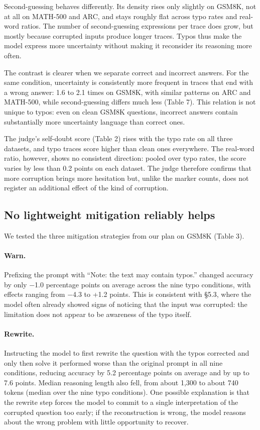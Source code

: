 \documentclass[11pt]{article}
\begin{document}
Second-guessing behaves differently. Its density rises only slightly on GSM8K, not at all on MATH-500 and ARC, and stays roughly flat across typo rates and real-word ratios. The number of second-guessing expressions per trace does grow, but mostly because corrupted inputs produce longer traces. Typos thus make the model express more uncertainty without making it reconsider its reasoning more often.

The contrast is clearer when we separate correct and incorrect answers. For the same condition, uncertainty is consistently more frequent in traces that end with a wrong answer: 1.6 to 2.1 times on GSM8K, with similar patterns on ARC and MATH-500, while second-guessing differs much less (Table 7). This relation is not unique to typos: even on clean GSM8K questions, incorrect answers contain substantially more uncertainty language than correct ones.

The judge's self-doubt score (Table 2) rises with the typo rate on all three datasets, and typo traces score higher than clean ones everywhere. The real-word ratio, however, shows no consistent direction: pooled over typo rates, the score varies by less than 0.2 points on each dataset. The judge therefore confirms that more corruption brings more hesitation but, unlike the marker counts, does not register an additional effect of the kind of corruption.

\subsection{No lightweight mitigation reliably helps}
We tested the three mitigation strategies from our plan on GSM8K (Table 3).

\paragraph{Warn.} Prefixing the prompt with ``Note: the text may contain typos.'' changed accuracy by only $-$1.0 percentage points on average across the nine typo conditions, with effects ranging from $-$4.3 to +1.2 points. This is consistent with \S5.3, where the model often already showed signs of noticing that the input was corrupted: the limitation does not appear to be awareness of the typo itself.

\paragraph{Rewrite.} Instructing the model to first rewrite the question with the typos corrected and only then solve it performed worse than the original prompt in all nine conditions, reducing accuracy by 5.2 percentage points on average and by up to 7.6 points. Median reasoning length also fell, from about 1,300 to about 740 tokens (median over the nine typo conditions). One possible explanation is that the rewrite step forces the model to commit to a single interpretation of the corrupted question too early; if the reconstruction is wrong, the model reasons about the wrong problem with little opportunity to recover.
\end{document}

